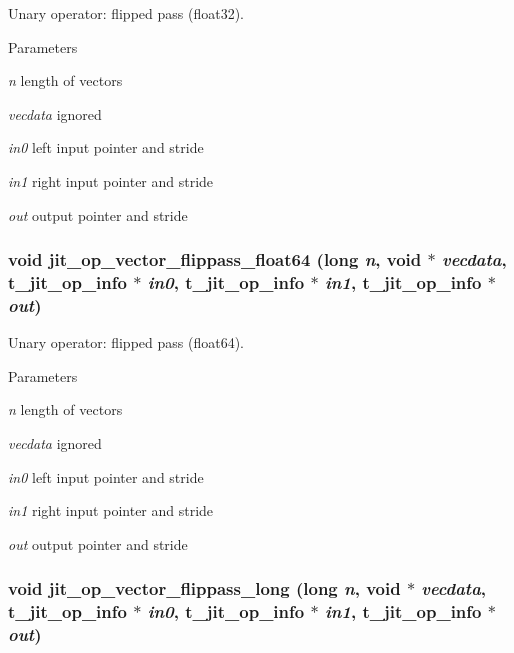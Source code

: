 Unary operator: flipped pass (float32). 
\begin{DoxyParams}{Parameters}
\item[{\em n}]length of vectors \item[{\em vecdata}]ignored \item[{\em in0}]left input pointer and stride \item[{\em in1}]right input pointer and stride \item[{\em out}]output pointer and stride \end{DoxyParams}
\hypertarget{group__opvecmod_gaf66a46b630eae9f23c6e2d5f93eb2233}{
\subsubsection[{jit\_\-op\_\-vector\_\-flippass\_\-float64}]{\setlength{\rightskip}{0pt plus 5cm}void jit\_\-op\_\-vector\_\-flippass\_\-float64 (long {\em n}, \/  void $\ast$ {\em vecdata}, \/  {\bf t\_\-jit\_\-op\_\-info} $\ast$ {\em in0}, \/  {\bf t\_\-jit\_\-op\_\-info} $\ast$ {\em in1}, \/  {\bf t\_\-jit\_\-op\_\-info} $\ast$ {\em out})}}
\label{group__opvecmod_gaf66a46b630eae9f23c6e2d5f93eb2233}


Unary operator: flipped pass (float64). 
\begin{DoxyParams}{Parameters}
\item[{\em n}]length of vectors \item[{\em vecdata}]ignored \item[{\em in0}]left input pointer and stride \item[{\em in1}]right input pointer and stride \item[{\em out}]output pointer and stride \end{DoxyParams}
\hypertarget{group__opvecmod_gaf5cd2ed8198cee977810eae076175957}{
\subsubsection[{jit\_\-op\_\-vector\_\-flippass\_\-long}]{\setlength{\rightskip}{0pt plus 5cm}void jit\_\-op\_\-vector\_\-flippass\_\-long (long {\em n}, \/  void $\ast$ {\em vecdata}, \/  {\bf t\_\-jit\_\-op\_\-info} $\ast$ {\em in0}, \/  {\bf t\_\-jit\_\-op\_\-info} $\ast$ {\em in1}, \/  {\bf t\_\-jit\_\-op\_\-info} $\ast$ {\em out})}}
\label{group__opvecmod_gaf5cd2ed8198cee977810eae076175957}


